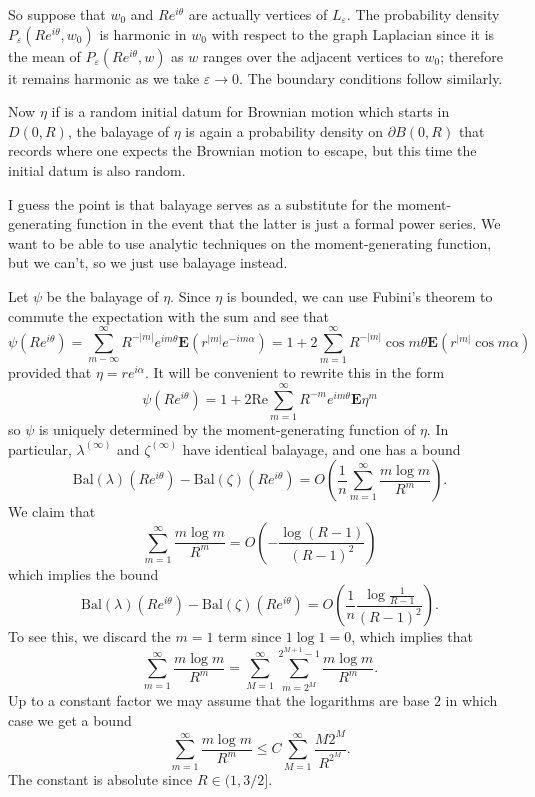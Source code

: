 \documentclass[12pt]{article}
\begin{document}
So suppose that $w_0$ and $Re^{i\theta}$ are actually vertices of $L_\varepsilon$.
The probability density $P_\varepsilon(Re^{i\theta}, w_0)$ is harmonic in $w_0$ with respect to the graph Laplacian since it is the mean of $P_\varepsilon(Re^{i\theta}, w)$ as $w$ ranges over the adjacent vertices to $w_0$; therefore it remains harmonic as we take $\varepsilon \to 0$.
The boundary conditions follow similarly.

Now $\eta$ if is a random initial datum for Brownian motion which starts in $D(0, R)$, the balayage of $\eta$ is again a probability density on $\partial B(0, R)$ that records where one expects the Brownian motion to escape, but this time the initial datum is also random.

I guess the point is that balayage serves as a substitute for the moment-generating function in the event that the latter is just a formal power series.
We want to be able to use analytic techniques on the moment-generating function, but we can't, so we just use balayage instead.

Let $\psi$ be the balayage of $\eta$. Since $\eta$ is bounded, we can use Fubini's theorem to commute the expectation with the sum and see that
$$\psi(Re^{i\theta}) = \sum_{m-\infty}^\infty R^{-|m|} e^{im\theta} \mathbf E(r^{|m|} e^{-im\alpha}) = 1 + 2\sum_{m=1}^\infty R^{-|m|} \cos m\theta \mathbf E(r^{|m|} \cos m\alpha)$$
provided that $\eta = re^{i\alpha}$.
It will be convenient to rewrite this in the form
$$\psi(Re^{i\theta}) = 1 + 2\text{Re} \sum_{m=1}^\infty R^{-m}e^{im\theta} \mathbf E\eta^m$$
so $\psi$ is uniquely determined by the moment-generating function of $\eta$. In particular, $\lambda^{(\infty)}$ and $\zeta^{(\infty)}$ have identical balayage, and one has a bound
$$\text{Bal}(\lambda)(Re^{i\theta}) - \text{Bal}(\zeta)(Re^{i\theta}) = O\left(\frac{1}{n}\sum_{m=1}^\infty \frac{m \log m}{R^m}\right).$$
We claim that
$$\sum_{m=1}^\infty \frac{m \log m}{R^m} = O\left(-\frac{\log(R-1)}{(R - 1)^2}\right)$$
which implies the bound
$$\text{Bal}(\lambda)(Re^{i\theta}) - \text{Bal}(\zeta)(Re^{i\theta}) = O\left(\frac{1}{n}\frac{\log\frac{1}{R-1}}{(R - 1)^2}\right).$$
To see this, we discard the $m = 1$ term since $1 \log 1 = 0$, which implies that
$$\sum_{m=1}^\infty \frac{m \log m}{R^m} = \sum_{M=1}^\infty \sum_{m=2^M}^{2^{M+1} - 1} \frac{m \log m}{R^m}.$$
Up to a constant factor we may assume that the logarithms are base $2$ in which case we get a bound
$$\sum_{m=1}^\infty \frac{m \log m}{R^m} \leq C\sum_{M=1}^\infty \frac{M2^M}{R^{2^M}}.$$
The constant is absolute since $R \in (1, 3/2]$.
\end{document}
